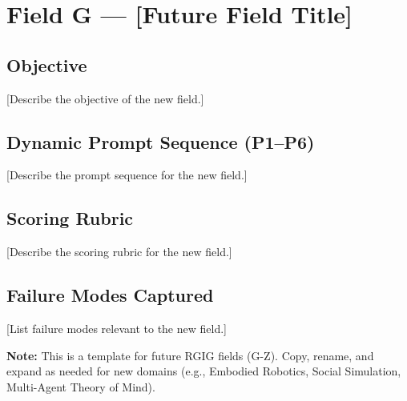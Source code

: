 \section{Field G — [Future Field Title]}
\label{sec:fieldG}

\subsection*{Objective}
[Describe the objective of the new field.]

\subsection*{Dynamic Prompt Sequence (P1–P6)}
[Describe the prompt sequence for the new field.]

\subsection*{Scoring Rubric}
[Describe the scoring rubric for the new field.]

\subsection*{Failure Modes Captured}
[List failure modes relevant to the new field.]

\textbf{Note:} This is a template for future RGIG fields (G-Z). Copy, rename, and expand as needed for new domains (e.g., Embodied Robotics, Social Simulation, Multi-Agent Theory of Mind). 